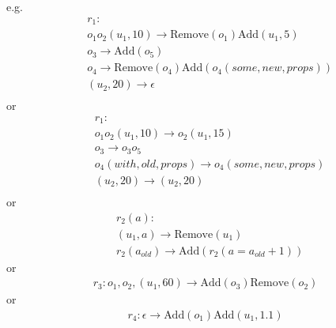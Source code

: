 \documentclass[9pt,a4paper,twoside]{article}
\begin{document}
            e.g. 
            \begin{equation}
                \begin{align}
                    &r_1: \\
                    &o_1o_2(u_1, 10) \rightarrow \text{Remove}(o_1)\text{Add}(u_1, 5)  \\
                    &o_3 \rightarrow \text{Add}(o_5) \\
                    &o_4 \rightarrow \text{Remove}(o_4)\text{Add}(o_4(some,new,props)) \\
                    &(u_2, 20) \rightarrow \epsilon \\
                \end{align}
            \end{equation}
            or
             \begin{equation}
                \begin{align}
                    &r_1: \\
                    &o_1o_2(u_1, 10) \rightarrow o_2(u_1, 15)  \\
                    &o_3 \rightarrow o_3o_5 \\
                    &o_4(with,old,props) \rightarrow o_4(some,new,props) \\
                    &(u_2, 20) \rightarrow (u_2, 20) \\
                \end{align}
            \end{equation}
            or
            \begin{equation}
                \begin{align}
                    &r_2(a): \\
                    &(u_1, a) \rightarrow \text{Remove}(u_1) \\
                    &r_2(a_{old}) \rightarrow \text{Add}(r_2(a = a_{old} + 1))
                \end{align}
            \end{equation}
            or
            \begin{equation}
                \begin{align}
                    r_3: o_1,o_2,(u_1, 60) \rightarrow \text{Add}(o_3)\text{Remove}(o_2)
                \end{align}
            \end{equation}
            or
            \begin{equation}
                \begin{align}
                    r_4:\epsilon \rightarrow \text{Add}(o_1)\text{Add}(u_1, 1.1)
                \end{align}
            \end{equation}
\end{document}
